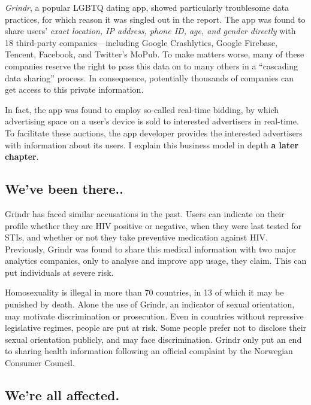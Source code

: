 \documentclass[
]{book}
\begin{document}
\emph{Grindr}, a popular LGBTQ dating app, showed particularly troublesome data practices, for which reason it was singled out in the report. The app was found to share users' \emph{exact location, IP address, phone ID, age, and gender directly} with 18 third-party companies---including Google Crashlytics, Google Firebase, Tencent, Facebook, and Twitter's MoPub. To make matters worse, many of these companies reserve the right to pass this data on to many others in a ``cascading data sharing'' process. In consequence, potentially thousands of companies can get access to this private information.

In fact, the app was found to employ so-called real-time bidding, by which advertising space on a user's device is sold to interested advertisers in real-time. To facilitate these auctions, the app developer provides the interested advertisers with information about its users. I explain this business model in depth \textbf{a later chapter}.

\hypertarget{weve-been-there..}{%
\subsection{We've been there..}\label{weve-been-there..}}

Grindr has faced similar accusations in the past. Users can indicate on their profile whether they are HIV positive or negative, when they were last tested for STIs, and whether or not they take preventive medication against HIV. Previously, Grindr was found to share this medical information with two major analytics companies, only to analyse and improve app usage, they claim. This can put individuals at severe risk.

Homosexuality is illegal in more than 70 countries, in 13 of which it may be punished by death. Alone the use of Grindr, an indicator of sexual orientation, may motivate discrimination or prosecution. Even in countries without repressive legislative regimes, people are put at risk. Some people prefer not to disclose their sexual orientation publicly, and may face discrimination. Grindr only put an end to sharing health information following an official complaint by the Norwegian Consumer Council.

\hypertarget{were-all-affected.}{%
\subsection{We're all affected.}\label{were-all-affected.}}
\end{document}
